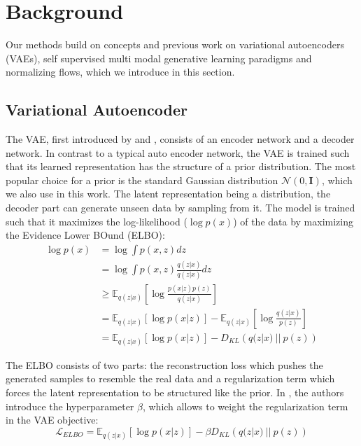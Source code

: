 \chapter{Background}
Our methods build on concepts and previous work on variational autoencoders (VAEs), self supervised multi modal generative learning paradigms and normalizing flows, which we introduce in this section.


\section{Variational Autoencoder}
\label{subsec:vae}
The VAE, first introduced by \citep{kingma_auto-encoding_2014} and \citep{rezende_stochastic_2014}, consists of an encoder network and a decoder network.
In contrast to a typical auto encoder network, the VAE is trained such that its learned representation has the structure of a prior distribution.
The most popular choice for a prior is the standard Gaussian distribution $\mathcal{N}(0,\textbf{I})$, which we also use in this work.
The latent representation being a distribution, the decoder part can generate unseen data by sampling from it.
The model is trained such that it maximizes the log-likelihood ($\log p(x)$) of the data by maximizing the Evidence Lower BOund (ELBO):
\begin{equation}
    \label{vaeelbo}
    \begin{split}
        \log p(x) &= \log \int p(x,z) dz\\
        &=  \log \int p(x,z) \frac{q(z|x)}{q(z|x)}dz\\
        &\geq \mathbb{E} _{q(z|x)}[\log \frac{p(x|z)p(z)}{q(z|x)}]\\
        &= \mathbb{E} _{q(z|x)}[\log p(x|z)] - \mathbb{E} _{q(z|x)}[\log \frac{q(z|x)}{p(z)}]\\
        &= \mathbb{E} _{q(z|x)}[\log p(x|z)] - D_{KL}\left( q(z|x)\ ||\ p(z)\right)
    \end{split}
\end{equation}

The ELBO consists of two parts: the reconstruction loss which pushes the generated samples to resemble the real data and a regularization term which forces the latent representation to be structured like the prior.
In \citep{beta_vae}, the authors introduce the hyperparameter $\beta$, which allows to weight the regularization term in the VAE objective:
\begin{equation}
    \label{eq:vaeelbo}
    \mathcal{L}_{ELBO} = \mathbb{E} _{q(z|x)}[\log p(x|z)] - \beta D_{KL}\left( q(z|x)\ ||\ p(z)\right)
\end{equation}

